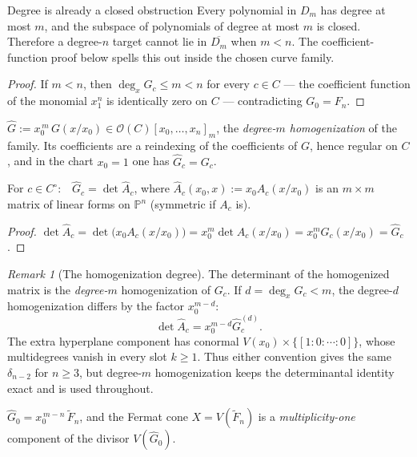 \documentclass[acmsmall,screen,nonacm]{acmart}
\theoremstyle{definition}
\theoremstyle{remark}
\newtheorem{remark}{Remark}[section]
\newcommand{\PP}{\mathbb{P}}
\newcommand{\OO}{\mathcal{O}}
\newcommand{\pdeg}{\delta}
\begin{document}
\begin{detailbox}{Degree is already a closed obstruction}
Every polynomial in $D_m$ has degree at most $m$, and the subspace of
polynomials of degree at most $m$ is closed.  Therefore a degree-$n$ target
cannot lie in $\overline{D_m}$ when $m<n$.  The coefficient-function proof
below spells this out inside the chosen curve family.
\end{detailbox}

\begin{proof}
If $m<n$, then $\deg_xG_c\le m<n$ for every $c\in C$ --- the
coefficient function of the monomial $x_1^n$ is identically zero on
$C$ --- contradicting $G_0=F_n$.
\end{proof}

\begin{definition}\label{def:homog}
$\widehat G:=x_0^{\,m}\,G(x/x_0)\in\OO(C)[x_0,\dots,x_n]_m$, the
\emph{degree-$m$ homogenization} of the family.  Its coefficients are
a reindexing of the coefficients of $G$, hence regular on $C$, and in
the chart $x_0=1$ one has $\widehat G_c=G_c$.
\end{definition}

\begin{lemma}\label{lem:fiberdet}
For $c\in C^\circ$:\ \ $\widehat G_c=\det\widehat A_c$, where
$\widehat A_c(x_0,x):=x_0A_c(x/x_0)$ is an $m\times m$ matrix of
linear forms on $\PP^n$ (symmetric if $A_c$ is).
\end{lemma}

\begin{proof}
$\det\widehat A_c=\det\big(x_0A_c(x/x_0)\big)
=x_0^m\det A_c(x/x_0)=x_0^mG_c(x/x_0)=\widehat G_c$.
\end{proof}

\begin{remark}[The homogenization degree]\label{rem:degreem}
The determinant of the homogenized matrix is the \emph{degree-$m$}
homogenization of $G_c$.  If $d=\deg_xG_c<m$, the degree-$d$
homogenization differs by the factor $x_0^{m-d}$:
\[
  \det\widehat A_c=x_0^{m-d}\widehat G_c^{(d)}.
\]
The extra hyperplane component has conormal
$V(x_0)\times\{[1:0:\cdots:0]\}$, whose multidegrees vanish in every
slot $k\ge1$.  Thus either convention gives the same
$\pdeg_{n-2}$ for $n\ge3$, but degree-$m$ homogenization keeps the
determinantal identity exact and is used throughout.
\end{remark}

\begin{lemma}\label{lem:specialfiber}
$\widehat G_0=x_0^{\,m-n}\,\widetilde F_n$, and the Fermat cone
$X=V(\widetilde F_n)$ is a \emph{multiplicity-one} component of the
divisor $V(\widehat G_0)$.
\end{lemma}
\end{document}
